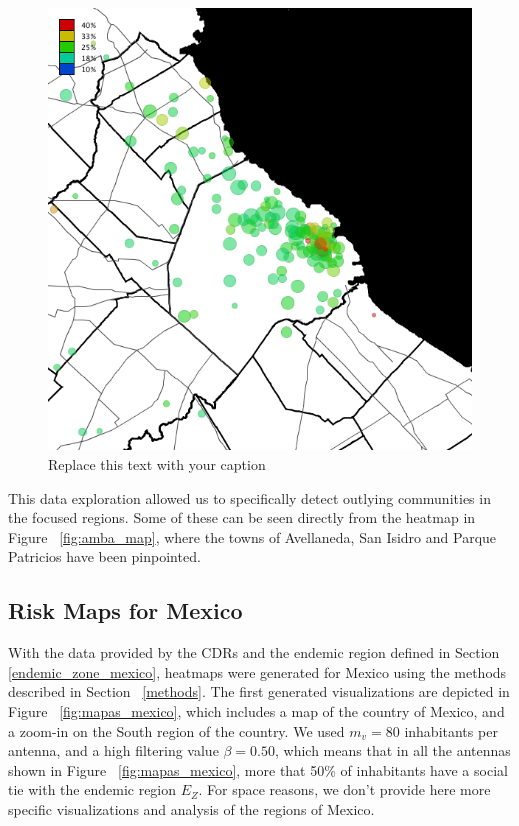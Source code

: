 \begin{figure}[h!]
	\begin{center}
		\includegraphics[width=0.35\columnwidth]{figures/201112_hi_res_amba_usuarios_proporcion_circulos_beta20/201112_hi_res_amba_usuarios_proporcion_circulos_beta20}
		\caption{Replace this text with your caption%
		}
	\end{center}
\end{figure}

This data exploration allowed us to specifically detect outlying communities in the focused regions. Some of these can be seen directly from the heatmap in Figure~ \cref{fig:amba_map}, where the towns of Avellaneda, San Isidro and Parque Patricios have been pinpointed.


\newpage

\subsection{Risk Maps for Mexico}

With the data provided by the CDRs and the endemic region defined in Section~ \cref{endemic_zone_mexico}, heatmaps were generated for Mexico using the methods described in Section~ \cref{methods}. The first generated visualizations are depicted in Figure~ \cref{fig:mapas_mexico},
which includes a map of the country of Mexico, and a zoom-in on the South region of the country.
We used $m_v = 80$ inhabitants per antenna, and a high filtering value $\beta = 0.50$, which
means that in all the antennas shown in Figure~ \cref{fig:mapas_mexico},
more that 50\% of inhabitants have a social tie with the endemic region $E_Z$.
For space reasons, we don't provide here more specific visualizations and analysis of the regions of Mexico.

